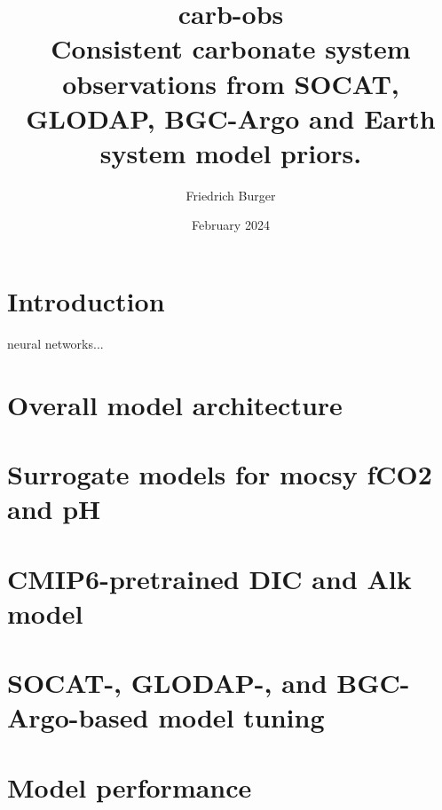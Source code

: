 \documentclass{article}
\title{\textbf{carb-obs} \\
\large Consistent carbonate system observations from SOCAT, GLODAP, BGC-Argo and Earth system model priors.}
\author{Friedrich Burger}
\date {February 2024}
\begin{document}
	
	\maketitle
	\tableofcontents
	\section{Introduction}
	neural networks...\cite{goodfellow2016}
	\section{Overall model architecture}
	\section{Surrogate models for mocsy fCO2 and pH}
	\section{CMIP6-pretrained DIC and Alk model}
	\section{SOCAT-, GLODAP-, and BGC-Argo-based model tuning}
	\section{Model performance}
	\medskip
	
	
	
\end{document}
